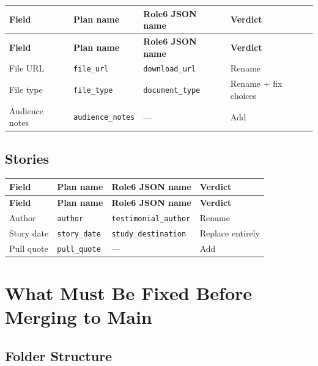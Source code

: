 \documentclass[12pt,a4paper]{article}
\begin{document}
\begin{longtable}{@{}p{3.5cm}p{3.5cm}p{3.5cm}p{1.8cm}@{}}
\toprule
\rowcolor{uvtLightBlue}
\textbf{Field} & \textbf{Plan name} & \textbf{Role6 JSON name} & \textbf{Verdict} \\
\midrule
\endfirsthead
\toprule
\rowcolor{uvtLightBlue}
\textbf{Field} & \textbf{Plan name} & \textbf{Role6 JSON name} & \textbf{Verdict} \\
\midrule
\endhead
\bottomrule
\endfoot
File URL & \texttt{file\_url} & \texttt{download\_url} & Rename \\
File type & \texttt{file\_type} & \texttt{document\_type} & Rename + fix choices \\
Audience notes & \texttt{audience\_notes} & --- & Add \\
\end{longtable}

\subsection{Stories}

\begin{longtable}{@{}p{3.5cm}p{3.5cm}p{3.5cm}p{1.8cm}@{}}
\toprule
\rowcolor{uvtLightBlue}
\textbf{Field} & \textbf{Plan name} & \textbf{Role6 JSON name} & \textbf{Verdict} \\
\midrule
\endfirsthead
\toprule
\rowcolor{uvtLightBlue}
\textbf{Field} & \textbf{Plan name} & \textbf{Role6 JSON name} & \textbf{Verdict} \\
\midrule
\endhead
\bottomrule
\endfoot
Author & \texttt{author} & \texttt{testimonial\_author} & Rename \\
Story date & \texttt{story\_date} & \texttt{study\_destination} & Replace entirely \\
Pull quote & \texttt{pull\_quote} & --- & Add \\
\end{longtable}

\section{What Must Be Fixed Before Merging to Main}

\subsection{Folder Structure}
\end{document}
